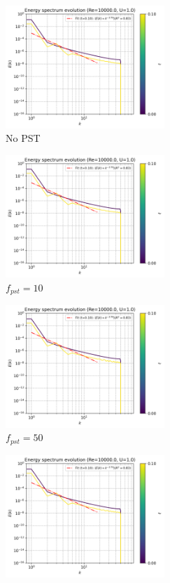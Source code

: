\begin{figure}[htbp!]
  \begin{subfigure}{7cm}
    \centering\includegraphics[width=6cm]{Code-Figures/keps/pst/c0_20_tait_pec_dtmul_1_nx_100_pst_-1_re_10000_k_eps/energy_spectrum_evolution.png}
    \caption{No PST}
  \end{subfigure}
  \begin{subfigure}{7cm}
    \centering\includegraphics[width=6cm]{Code-Figures/keps/pst/c0_20_tait_pec_dtmul_1_nx_100_pst_10_re_10000_k_eps/energy_spectrum_evolution.png}
    \caption{$f_{pst} = 10$}
  \end{subfigure}
  \begin{subfigure}{7cm}
    \centering\includegraphics[width=6cm]{Code-Figures/keps/pst/c0_20_tait_pec_dtmul_1_nx_100_pst_50_re_10000_k_eps/energy_spectrum_evolution.png}
    \caption{$f_{pst} = 50$}
  \end{subfigure}
  \begin{subfigure}{7cm}
    \centering\includegraphics[width=6cm]{Code-Figures/keps/pst/c0_20_tait_pec_dtmul_1_nx_100_pst_100_re_10000_k_eps/energy_spectrum_evolution.png}

\end{subfigure}
\end{figure}
